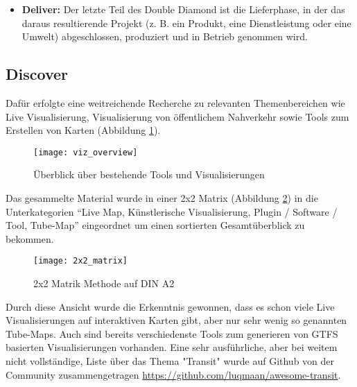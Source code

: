 \begin{newpage}
\begin{itemize}[label={}]
      \item \textbf{Deliver:} Der letzte Teil des Double Diamond ist die Lieferphase, in der das daraus resultierende Projekt (z. B. ein Produkt, eine Dienstleistung oder eine Umwelt) abgeschlossen, produziert und in Betrieb genommen wird.
    \end{itemize}
    

    \subsection{Discover}
    \label{sub:discover}
      Dafür erfolgte eine weitreichende Recherche zu relevanten Themenbereichen wie Live Visualisierung, Visualisierung von öffentlichem Nahverkehr sowie Tools zum Erstellen von Karten (Abbildung \ref{fig:viz_overview}). 

      \begin{figure}[ht]
        \begin{center}
          \texttt{[image: viz\_overview]}
          \caption{Überblick über bestehende Tools und Visualisierungen}
          \label{fig:viz_overview}
        \end{center}
      \end{figure}

      Das gesammelte Material wurde in einer 2x2 Matrix (Abbildung \ref{fig:2x2_matrix}) in die Unterkategorien "`Live Map, Künstlerische Visualisierung, Plugin / Software / Tool, Tube-Map"' eingeordnet um einen sortierten Gesamtüberblick zu bekommen. 

      \begin{figure}[htbp]
        \begin{center}
          \texttt{[image: 2x2\_matrix]}
          \caption{2x2 Matrik Methode auf DIN A2}
          \label{fig:2x2_matrix}
        \end{center}
      \end{figure}

      Durch diese Ansicht wurde die Erkenntnis gewonnen, dass es schon viele Live Visualisierungen auf interaktiven Karten gibt, aber nur sehr wenig so genannten Tube-Maps. Auch sind bereits verschiedenste Tools zum generieren von GTFS basierten Visualisierungen vorhanden. Eine sehr ausführliche, aber bei weitem nicht vollständige, Liste über das Thema "Transit" wurde auf Github von der Community zusammengetragen \url{https://github.com/luqmaan/awesome-transit}. 



\end{newpage}
